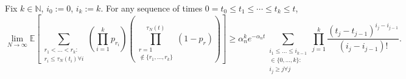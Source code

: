 \documentclass{article}
\newcommand{\E}{\mathbb{E}}
\newcommand{\1}[1]{\mathbbm{1}_{#1}}
\begin{document}
\begin{lemma}\label{thm:inductionLB}
Fix $k \in \mathbb{N}$, $i_0:=0$, $i_k:=k$. For any sequence of times
$0 = t_0 \leq t_1 \leq \cdots \leq t_k \leq t$,
\begin{equation}
\lim_{N\to\infty} \E \left[ 
        \sum_{\substack{r_1 <\dots< r_k :\\ r_i \leq \tau_N(t_i) \forall i}}
        \left( \prod_{i=1}^k p_{r_i} \right)
        \left( \prod_{\substack{r=1 \\ \notin \{r_1,\dots,r_k\} }}^{\tau_N(t)} 
        (1-p_r) \right) \right]
\geq \alpha_n^k e^{-\alpha_n t}
        \sum_{\substack{i_1\leq \dots\leq i_{k-1}\\ \in \{0,\dots,k\} :
        \\ i_j \geq j \forall j}} 
        \prod_{j=1}^k \frac{(t_j - t_{j-1})^{i_j - i_{j-1}}}{(i_j - i_{j-1})! } .
\end{equation}
\end{lemma}
\end{document}
